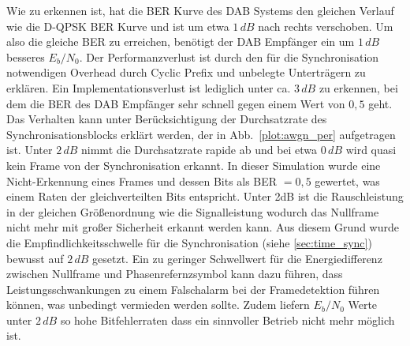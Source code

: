 Wie zu erkennen ist, hat die BER Kurve des DAB Systems den gleichen Verlauf wie die D-QPSK BER Kurve und ist um etwa $1\, dB$ nach rechts verschoben. Um also die gleiche BER zu erreichen, benötigt der DAB Empfänger ein um $1\, dB$ besseres $E_b/N_0$. Der Performanzverlust ist durch den für die Synchronisation notwendigen Overhead durch Cyclic Prefix und unbelegte Unterträgern zu erklären. Ein Implementationsverlust ist lediglich unter ca. $3\, dB$ zu erkennen, bei dem die BER des DAB Empfänger sehr schnell gegen einem Wert von $0,5$ geht.\\
Das Verhalten kann unter Berücksichtigung der Durchsatzrate des Synchronisationsblocks erklärt werden, der in Abb.~\ref{plot:awgn_per} aufgetragen ist. Unter $2\, dB$ nimmt die Durchsatzrate rapide ab und bei etwa $0\, dB$ wird quasi kein Frame von der Synchronisation erkannt. In dieser Simulation wurde eine Nicht-Erkennung eines Frames und dessen Bits als BER $= 0,5$ gewertet, was einem Raten der gleichverteilten Bits entspricht. Unter 2dB ist die Rauschleistung in der gleichen Größenordnung wie die Signalleistung wodurch das Nullframe nicht mehr mit großer Sicherheit erkannt werden kann. Aus diesem Grund wurde die Empfindlichkeitsschwelle für die Synchronisation (siehe \ref{sec:time_sync}) bewusst auf $2\, dB$ gesetzt. Ein zu geringer Schwellwert für die Energiedifferenz zwischen Nullframe und Phasenrefernzsymbol kann dazu führen, dass Leistungsschwankungen zu einem Falschalarm bei der Framedetektion führen können, was unbedingt vermieden werden sollte. Zudem liefern $E_b/N_0$ Werte unter $2\, dB$ so hohe Bitfehlerraten dass ein sinnvoller Betrieb nicht mehr möglich ist.


